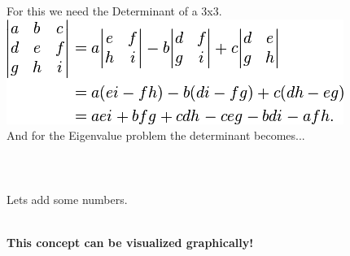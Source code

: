\documentclass[11pt]{article}
\begin{document}
\begin{itemize}
{For this we need the Determinant of a 3x3.\\

\includegraphics[scale=1]{lecture7_fig1.png} \\

And for the Eigenvalue problem the determinant becomes...\\\\

\\\\

Lets add some numbers.\\\\


\newpage
\item  \textbf{\LARGE This concept can be visualized graphically!}\\\\



}
\end{itemize}


	
\end{document}
